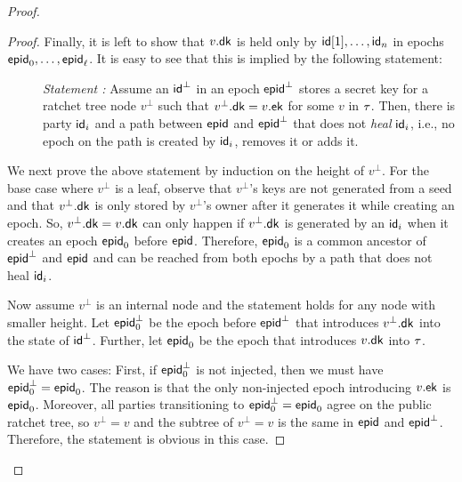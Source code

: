\begin{proof}
\begin{proof}
  Finally, it is left to show that $v.{\mathsf{dk}}$ is held only by ${\mathsf{id}}[1], \dots, {\mathsf{id}}_n$ in epochs ${\normalfont\textsf{epid}}_0, \dots, {\normalfont\textsf{epid}}_\ell$. It is easy to see that this is implied by the following statement:
  \begin{description}
    \item[] {\it Statement : } Assume an ${\mathsf{id}}^\bot$ in an epoch ${\normalfont\textsf{epid}}^\bot$ stores a secret key for a ratchet tree node $v^\bot$ such that $v^\bot.{\mathsf{dk}}=v.{\mathsf{ek}}$ for some $v$ in $\tau$. Then, there is party ${\mathsf{id}}_i$ and a path between ${\normalfont\textsf{epid}}$ and ${\normalfont\textsf{epid}}^\bot$ that does not \emph{heal} ${\mathsf{id}}_i$, i.e., no epoch on the path is created by ${\mathsf{id}}_i$, removes it or adds it.
  \end{description}
  We next prove the above statement by induction on the height of $v^\bot$.
  For the base case where $v^\bot$ is a leaf, observe that $v^\bot$'s keys are not generated from a seed and that $v^\bot.{\mathsf{dk}}$ is only stored by $v^\bot$'s owner after it generates it while creating an epoch. So, $v^\bot.{\mathsf{dk}}=v.{\mathsf{dk}}$ can only happen if $v^\bot.{\mathsf{dk}}$ is generated by an ${\mathsf{id}}_i$ when it creates an epoch ${\normalfont\textsf{epid}}_0$ before ${\normalfont\textsf{epid}}$. Therefore, ${\normalfont\textsf{epid}}_0$ is a common ancestor of ${\normalfont\textsf{epid}}^\bot$ and ${\normalfont\textsf{epid}}$ and can be reached from both epochs by a path that does not heal ${\mathsf{id}}_i$.

  Now assume $v^\bot$ is an internal node and the statement holds for any node with smaller height. Let ${\normalfont\textsf{epid}}_0^\bot$ be the epoch before ${\normalfont\textsf{epid}}^\bot$ that introduces $v^\bot.{\mathsf{dk}}$ into the state of ${\mathsf{id}}^\bot$. Further, let ${\normalfont\textsf{epid}}_0$ be the epoch that introduces $v.{\mathsf{dk}}$ into $\tau$.

  We have two cases: First, if ${\normalfont\textsf{epid}}^\bot_0$ is not injected, then we must have ${\normalfont\textsf{epid}}^\bot_0={\normalfont\textsf{epid}}_0$. The reason is that the only non-injected epoch introducing $v.{\mathsf{ek}}$ is ${\normalfont\textsf{epid}}_0$. Moreover, all parties transitioning to ${\normalfont\textsf{epid}}^\bot_0={\normalfont\textsf{epid}}_0$ agree on the public ratchet tree, so $v^\bot=v$ and the subtree of $v^\bot=v$ is the same in ${\normalfont\textsf{epid}}$ and ${\normalfont\textsf{epid}}^\bot$. Therefore, the statement is obvious in this case.


\end{proof}
\end{proof}
